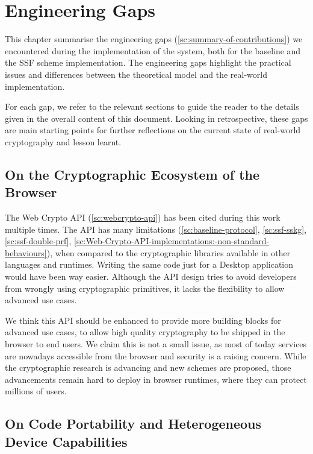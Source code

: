 \chapter{Engineering Gaps}\label{ch:gaps}

This chapter summarise the engineering gaps (\cref{sc:summary-of-contributions})
we encountered during the implementation of the system,
both for the baseline and the SSF scheme implementation.
The engineering gaps highlight the practical issues
and differences between the theoretical model and 
the real-world implementation.

For each gap, we refer to the relevant sections to guide the reader
to the details given in the overall content of this document.
Looking in retrospective, these gaps are main starting
points for further reflections on the current
state of real-world cryptography and lesson learnt.

\section{On the Cryptographic Ecosystem of the Browser}\label{sc:gap-webcrypto-api}

The Web Crypto API (\cref{sc:webcrypto-api})
has been cited during this work
multiple times. 
The API has many limitations 
(\cref{sc:baseline-protocol}, \cref{sc:ssf-sskg}, \cref{sc:ssf-double-prf}, \cref{sc:Web-Crypto-API-implementations:-non-standard-behaviours}),
when compared to the cryptographic libraries available
in other languages and runtimes.
Writing the same code just for a Desktop application
would have been way easier.
Although the API design tries to avoid developers from
wrongly using cryptographic primitives, it lacks
the flexibility to allow advanced use cases.

We think this API should
be enhanced to provide more building blocks
for advanced use cases, to allow high quality
cryptography to be shipped in the browser to
end users. We claim this is not a small issue,
as most of today services are nowadays accessible
from the browser and security is a raising concern.
While the cryptographic research is advancing and new
schemes are proposed, those advancements remain hard to
deploy in browser runtimes, where they can 
protect millions of users.

\section{On Code Portability and Heterogeneous Device Capabilities}\label{sc:gap-code-portability}

